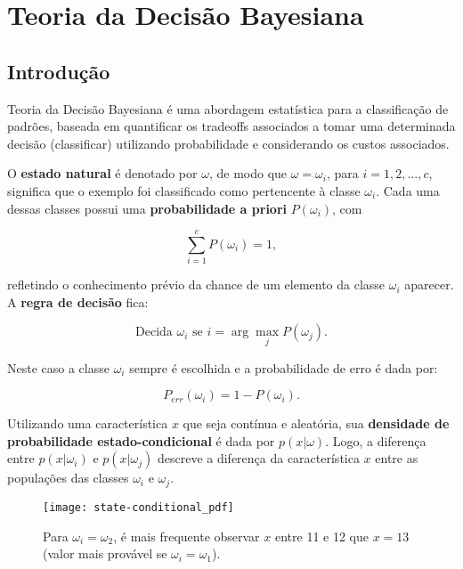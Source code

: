 \section{Teoria da Decisão Bayesiana}

\subsection{Introdução}

Teoria da Decisão Bayesiana é uma abordagem estatística para a classificação de
padrões, baseada em quantificar os tradeoffs associados a tomar uma determinada
decisão (classificar) utilizando probabilidade e considerando os custos associados.

O \textbf{estado natural} é denotado por $\omega$, de modo que $\omega = \omega_i$, para $i = 1, 2, ..., c$, significa que o exemplo foi classificado como pertencente à classe $\omega_i$. Cada uma dessas classes possui uma \textbf{probabilidade a priori} $P(\omega_i)$, com

\begin{equation}
    \sum_{i=1}^{c} P(\omega_i) = 1,
    \label{eq:sum_priori_probs_to_one}
\end{equation}

\noindent refletindo o conhecimento prévio da chance de um elemento da classe $\omega_i$ aparecer. A \textbf{regra de decisão} fica:

\begin{equation}
    \text{Decida } \omega_i \text{ se } i = \arg\max_j P(\omega_j).
    \label{eq:decision_1}
\end{equation}

\noindent Neste caso a classe $\omega_i$ sempre é escolhida e a probabilidade de erro é dada por:

\begin{equation}
    P_{err}(\omega_i) = 1 - P(\omega_i).
    \label{eq:prob_i_error}
\end{equation}

Utilizando uma característica $x$ que seja contínua e aleatória, sua \textbf{densidade de probabilidade estado-condicional} é dada por $p(x|\omega)$. Logo, a diferença entre $p(x|\omega_i)$ e $p(x|\omega_j)$ descreve a diferença da característica $x$ entre as populações das classes $\omega_i$ e $\omega_j$.

\begin{figure}[ht]
    \centering
    \texttt{[image: state-conditional\_pdf]}
    \caption{Para $\omega_i = \omega_2$, é mais frequente observar $x$ entre 11 e 12 que $x = 13$ (valor mais provável se $\omega_i = \omega_1$).}
    \label{fig:state-conditional_pdf}
\end{figure}

